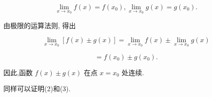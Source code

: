 \documentclass[lang=cn,newtx,10pt,scheme=chinese]{elegantbook}
\begin{document}
\[
\mathop{\lim }\limits_{{x \rightarrow {x}_{0}}}f\left( x\right) = f\left( {x}_{0}\right) ,\mathop{\lim }\limits_{{x \rightarrow {x}_{0}}}g\left( x\right) = g\left( {x}_{0}\right) .
\]

由极限的运算法则, 得出

\[
\mathop{\lim }\limits_{{x \rightarrow {x}_{0}}}\left\lbrack {f\left( x\right) \pm g\left( x\right) }\right\rbrack = \mathop{\lim }\limits_{{x \rightarrow {x}_{0}}}f\left( x\right) \pm \mathop{\lim }\limits_{{x \rightarrow {x}_{0}}}g\left( x\right)
\]

\[
= f\left( {x}_{0}\right) \pm g\left( {x}_{0}\right) \text{.}
\]

因此,函数 \(f\left( x\right) \pm g\left( x\right)\) 在点 \(x = {x}_{0}\) 处连续.

同样可以证明(2)和(3).
\end{document}
